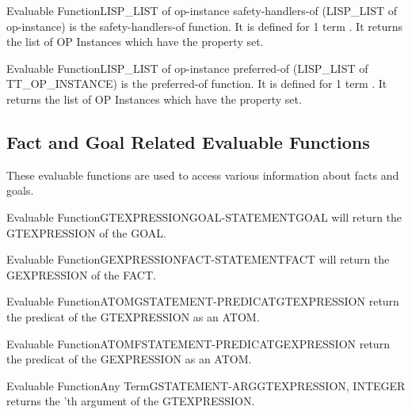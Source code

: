 \begin{typeefa}{Evaluable Function}{LISP\_LIST of op-instance} {safety-handlers-of}
{(LISP\_LIST of op-instance)}
is the safety-handlers-of function. It is defined for 1 term
. It returns the list of OP Instances which have the property
 set.
\end{typeefa}

\begin{typeefa}{Evaluable Function}{LISP\_LIST of op-instance} {preferred-of}
{(LISP\_LIST of TT\_OP\_INSTANCE)} 
is the preferred-of function. It is defined for 1 term . It
returns the list of OP Instances which have the property 
set.
\end{typeefa}

\subsection{Fact and Goal Related Evaluable Functions}

These evaluable functions are used to access various information about facts
and goals.

\begin{typeefa}{Evaluable Function}{GTEXPRESSION}{GOAL-STATEMENT}{GOAL}
will return the GTEXPRESSION of the GOAL.
\end{typeefa}

\begin{typeefa}{Evaluable Function}{GEXPRESSION}{FACT-STATEMENT}{FACT}
will return the GEXPRESSION of the FACT.
\end{typeefa}

\begin{typeefa}{Evaluable Function}{ATOM}{GSTATEMENT-PREDICAT}{GTEXPRESSION}
return the predicat of the GTEXPRESSION as an ATOM.
\end{typeefa}

\begin{typeefa}{Evaluable Function}{ATOM}{FSTATEMENT-PREDICAT}{GEXPRESSION}
return the predicat of the GEXPRESSION as an ATOM.
\end{typeefa}

\begin{typeefa}{Evaluable Function}{Any Term}{GSTATEMENT-ARG}{GTEXPRESSION, INTEGER }
returns the 'th argument of the GTEXPRESSION.
\end{typeefa}

